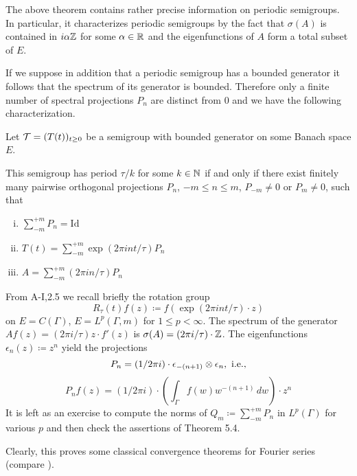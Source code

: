 The above theorem contains rather precise information on periodic semigroups.
In particular, it characterizes periodic semigroups by the fact that $\sigma(A)$ is contained in $i\alpha\mathbb{Z}$ for some $\alpha \in \mathbb{R}$ and the eigenfunctions of $A$ form a total subset of $E$.

If we suppose in addition that a periodic semigroup has a bounded generator it follows that the spectrum of its generator is bounded.
Therefore only a finite number of spectral projections $P_{n}$ are distinct from $0$ and we have the following characterization.
\begin{corollary}\label{cor:a3-5.5}
Let $\mathcal{T} = (T(t))_{t \geq 0}$ be a semigroup with bounded generator on some Banach space $E$.

This semigroup has period $\tau/k$ for some $k \in \mathbb{N}$ if and only if there exist finitely many pairwise orthogonal projections $P_{n}$, $-m \leq n \leq m$, $P_{-m} \neq 0$ or $P_{m} \neq 0$, such that
\begin{enumerate}[(i)]
\item 
$\sum_{-m}^{+m} P_{n} = \text{Id}$

\item 
$T(t) = \sum_{-m}^{+m} \exp(2\pi int/\tau)P_{n}$

\item 
$A = \sum_{-m}^{+m} (2\pi in/\tau)P_{n}$

\end{enumerate}
\end{corollary}
\begin{example}\label{ex:a3-5.6}
From A-I,2.5 we recall briefly the rotation group
\[
R_{\tau}(t)f(z) \coloneqq f(\exp(2\pi int/\tau) \cdot z)
\]
on $E = C(\Gamma)$, \resp $E = L^{p}(\Gamma,m)$ for $1 \leq p < \infty$.
The spectrum of the generator\quad
$Af(z) = (2\pi i/\tau)z \cdot f'(z)$\quad
is \quad $\sigma(A) = (2\pi i/\tau)\cdot\mathbb{Z}$.
The eigenfunctions $\epsilon_{n}(z) \coloneqq z^{n}$ yield the projections
\[
P_{n} = (1/2\pi i)\cdot\epsilon_{-(n+1)} \otimes \epsilon_{n}, \text{ i.e.,}
\]
\[
P_{n}f(z) = (1/2\pi i)\cdot(\int_{\Gamma} f(w)w^{-(n+1)} \, dw)\cdot z^{n}
\]
It is left as an exercise to compute the norms of $Q_{m} \coloneqq \sum_{-m}^{+m} P_{n}$ in $L^{p}(\Gamma)$ for various $p$ and then check the assertions of Theorem 5.4.

Clearly, this proves some classical convergence theorems for Fourier series (compare \citet[Chap.8.1]{davies:1980}).
\end{example}
